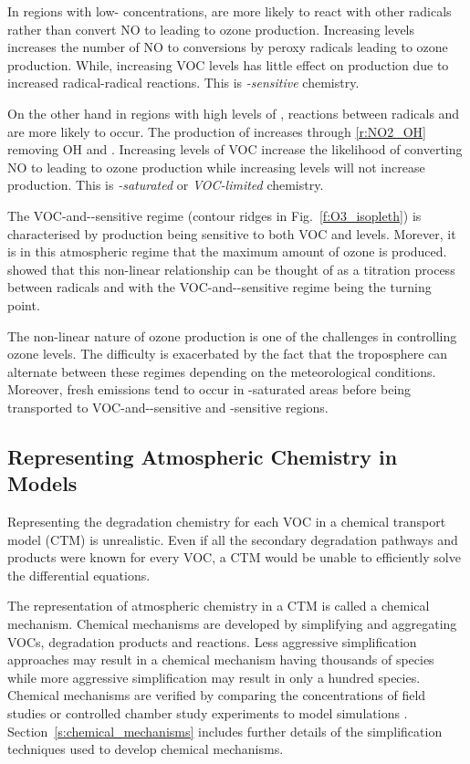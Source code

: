 \vbox{%
In regions with low- concentrations,  are more likely to react with other radicals rather than convert NO to  leading to ozone production.
Increasing  levels increases the number of NO to  conversions by peroxy radicals leading to ozone production.
While, increasing VOC levels has little effect on  production due to increased radical-radical reactions.
This is \emph{-sensitive} chemistry.  
}

On the other hand in regions with high levels of , reactions between radicals and  are more likely to occur.
The production of  increases through \eqref{r:NO2_OH} removing OH and .
Increasing levels of VOC increase the likelihood of  converting NO to  leading to ozone production while increasing  levels will not increase  production.  
This is \emph{-saturated} or \emph{VOC-limited} chemistry.

The VOC-and--sensitive regime (contour ridges in Fig.~\ref{f:O3_isopleth}) is characterised by  production being sensitive to both VOC and  levels. 
Morever, it is in this atmospheric regime that the maximum amount of ozone is produced.
\citet{Kleinman:1994} showed that this non-linear relationship can be thought of as a titration process between radicals and  with the VOC-and--sensitive regime being the turning point.

The non-linear nature of ozone production is one of the challenges in controlling ozone levels.
The difficulty is exacerbated by the fact that the troposphere can alternate between these regimes depending on the meteorological conditions.
Moreover, fresh emissions tend to occur in -saturated areas before being transported to VOC-and--sensitive and -sensitive regions.

\subsection{Representing Atmospheric Chemistry in Models} \label{ss:chemistry_models}
Representing the degradation chemistry for each VOC in a chemical transport model (CTM) is unrealistic.
Even if all the secondary degradation pathways and products were known for every VOC, a CTM would be unable to efficiently solve the differential equations.

\vbox{%
The representation of atmospheric chemistry in a CTM is called a chemical mechanism.
Chemical mechanisms are developed by simplifying and aggregating VOCs, degradation products and reactions.
Less aggressive simplification approaches may result in a chemical mechanism having thousands of species while more aggressive simplification may result in only a hundred species. 
Chemical mechanisms are verified by comparing the concentrations of field studies or controlled chamber study experiments to model simulations \citep{Stockwell:2012}.
Section~\ref{s:chemical_mechanisms} includes further details of the simplification techniques used to develop chemical mechanisms.
}


